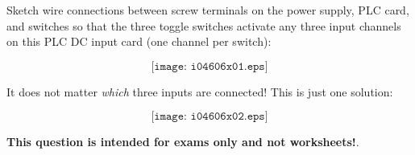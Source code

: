 

Sketch wire connections between screw terminals on the power supply, PLC card, and switches so that the three toggle switches activate any three input channels on this PLC DC input card (one channel per switch):

$$\texttt{[image: i04606x01.eps]}$$







It does not matter {\it which} three inputs are connected!  This is just one solution:

$$\texttt{[image: i04606x02.eps]}$$







{\bf This question is intended for exams only and not worksheets!}.


